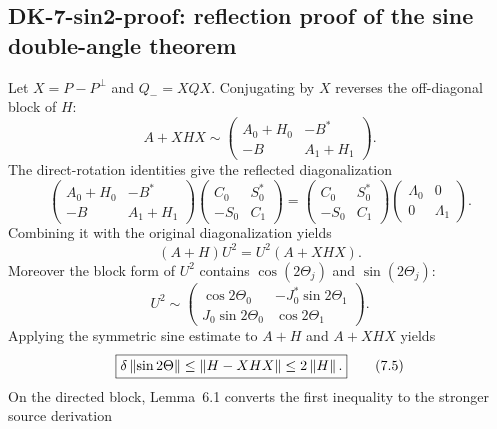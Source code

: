 \subsection*{DK-7-sin2-proof: reflection proof of the sine double-angle theorem}
Let $X=P-P^\perp$ and $Q_-=XQX$.  Conjugating by $X$ reverses the off-diagonal block of $H$:
\begin{equation}
 A+XHX\sim\begin{pmatrix}A_0+H_0&-B^*\\-B&A_1+H_1\end{pmatrix}.
 \tag{7.1}
\end{equation}
The direct-rotation identities give the reflected diagonalization
\begin{equation}
 \begin{pmatrix}A_0+H_0&-B^*\\-B&A_1+H_1\end{pmatrix}
 \begin{pmatrix}C_0&S_0^*\\-S_0&C_1\end{pmatrix}
 =
 \begin{pmatrix}C_0&S_0^*\\-S_0&C_1\end{pmatrix}
 \begin{pmatrix}\Lambda_0&0\\0&\Lambda_1\end{pmatrix}.
 \tag{7.2}
\end{equation}
Combining it with the original diagonalization yields
\begin{equation}
 (A+H)U^2=U^2(A+XHX).
 \tag{7.3}
\end{equation}
Moreover the block form of $U^2$ contains $\cos(2\Theta_j)$ and $\sin(2\Theta_j)$:
\begin{equation}
 U^2\sim
 \begin{pmatrix}
 \cos2\Theta_0&-J_0^*\sin2\Theta_1\\
 J_0\sin2\Theta_0&\cos2\Theta_1
 \end{pmatrix}.
 \tag{7.4}
\end{equation}
Applying the symmetric sine estimate to $A+H$ and $A+XHX$ yields
\begin{equation}
 \boxed{\delta\left\lVert \sin2\Theta\right\rVert\le\left\lVert H-XHX\right\rVert\le2\left\lVert H\right\rVert.}
 \tag{7.5}
\end{equation}
On the directed block, Lemma~6.1 converts the first inequality to the stronger source derivation
